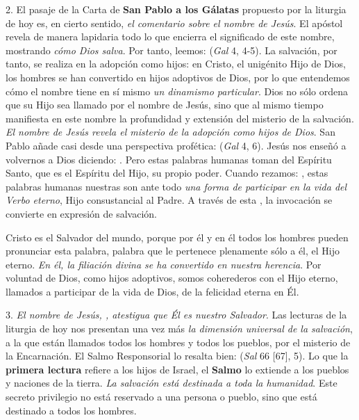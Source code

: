 \begin{body}
	2. El pasaje de la Carta de \textbf{San Pablo a los Gálatas} propuesto por la liturgia de hoy es, en cierto sentido, \emph{el comentario sobre el nombre de Jesús}. El apóstol revela de manera lapidaria todo lo que encierra el significado de este nombre, mostrando \emph{cómo Dios salva}. Por tanto, leemos:  (\emph{Gal} 4, 4-5). La salvación, por tanto, se realiza en la adopción como hijos: en Cristo, el unigénito Hijo de Dios, los hombres se han convertido en hijos adoptivos de Dios, por lo que entendemos cómo el nombre  tiene en sí mismo \emph{un dinamismo particular}. Dios no sólo ordena que su Hijo sea llamado por el nombre de Jesús, sino que al mismo tiempo manifiesta en este nombre la profundidad y extensión del misterio de la salvación. \emph{El nombre de Jesús revela el misterio de la adopción como hijos de Dios}. San Pablo añade casi desde una perspectiva profética:  (\emph{Gal} 4, 6). Jesús nos enseñó a volvernos a Dios diciendo: . Pero estas palabras humanas toman del Espíritu Santo, que es el Espíritu del Hijo, su propio poder. Cuando rezamos: , estas palabras humanas nuestras son ante todo \emph{una forma de participar en la vida del Verbo eterno}, Hijo consustancial al Padre. A través de esta , la invocación  se convierte en expresión de salvación.
	
	Cristo es el Salvador del mundo, porque por él y en él todos los hombres pueden pronunciar esta palabra, palabra que le pertenece plenamente sólo a él, el Hijo eterno. \emph{En él, la filiación divina se ha convertido en nuestra herencia}. Por voluntad de Dios, como hijos adoptivos, somos coherederos con el Hijo eterno, llamados a participar de la vida de Dios, de la felicidad eterna en Él.
	
	3. \emph{El nombre de Jesús, , atestigua que Él es nuestro Salvador}. Las lecturas de la liturgia de hoy nos presentan una vez más \emph{la dimensión universal de la salvación}, a la que están llamados todos los hombres y todos los pueblos, por el misterio de la Encarnación. El Salmo Responsorial lo resalta bien:  (\emph{Sal} 66 {[}67{]}, 5). Lo que la \textbf{primera lectura} refiere a los hijos de Israel, el \textbf{Salmo} lo extiende a los pueblos y naciones de la tierra. \emph{La salvación está destinada a toda la humanidad}. Este secreto privilegio no está reservado a una persona o pueblo, sino que está destinado a todos los hombres.
	

\end{body}
